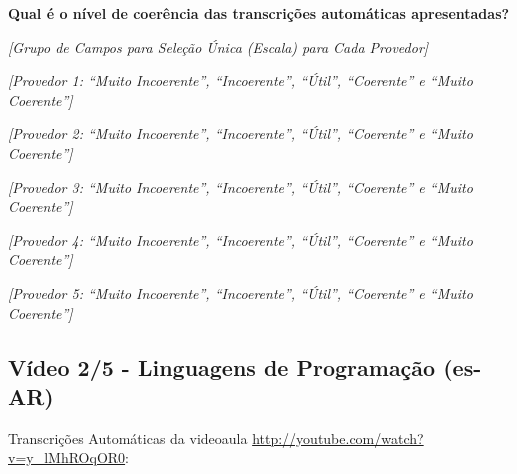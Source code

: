 \noindent
\textbf{Qual é o nível de coerência das transcrições automáticas apresentadas?}

\noindent
\textit{[Grupo de Campos para Seleção Única (Escala) para Cada Provedor]}

\noindent
\textit{[Provedor 1: ``Muito Incoerente'', ``Incoerente'', ``Útil'', ``Coerente'' e ``Muito Coerente'']}

\noindent
\textit{[Provedor 2: ``Muito Incoerente'', ``Incoerente'', ``Útil'', ``Coerente'' e ``Muito Coerente'']}

\noindent
\textit{[Provedor 3: ``Muito Incoerente'', ``Incoerente'', ``Útil'', ``Coerente'' e ``Muito Coerente'']}

\noindent
\textit{[Provedor 4: ``Muito Incoerente'', ``Incoerente'', ``Útil'', ``Coerente'' e ``Muito Coerente'']}

\noindent
\textit{[Provedor 5: ``Muito Incoerente'', ``Incoerente'', ``Útil'', ``Coerente'' e ``Muito Coerente'']}

\subsection{Vídeo 2/5 - Linguagens de Programação (es-AR)}

\noindent
Transcrições Automáticas da videoaula \url{http://youtube.com/watch?v=y_lMhROqOR0}:

